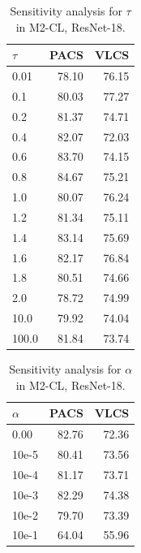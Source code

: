 \documentclass{article}
\begin{document}
\begin{table}[htbp]
\centering
\caption{Sensitivity analysis for $\tau$ in M2-CL, ResNet-18.}
\scriptsize
\begin{tabular}{lrr}
\toprule
$\tau$ & PACS & VLCS \\
\midrule
0.01 & 78.10 & 76.15 \\
0.1 & 80.03 & 77.27 \\
0.2 & 81.37 & 74.71 \\
0.4 & 82.07 & 72.03 \\
0.6 & 83.70 & 74.15 \\
0.8 & 84.67 & 75.21 \\
1.0 & 80.07 & 76.24 \\
1.2 & 81.34 & 75.11 \\
1.4 & 83.14 & 75.69 \\
1.6 & 82.17 & 76.84 \\
1.8 & 80.51 & 74.66 \\
2.0 & 78.72 & 74.99 \\
10.0 & 79.92 & 74.04 \\
100.0 & 81.84 & 73.74 \\
\bottomrule
\end{tabular}
\end{table}

\begin{table}[htbp]
\centering
\caption{Sensitivity analysis for $\alpha$ in M2-CL, ResNet-18.}
\scriptsize
\begin{tabular}{lrr}
\toprule
$\alpha$ & PACS & VLCS \\
\midrule
0.00 & 82.76 & 72.36 \\
10e-5 & 80.41 & 73.56 \\
10e-4 & 81.17 & 73.71 \\
10e-3 & 82.29 & 74.38 \\
10e-2 & 79.70 & 73.39 \\
10e-1 & 64.04 & 55.96 \\
\bottomrule
\end{tabular}
\end{table}
\end{document}
